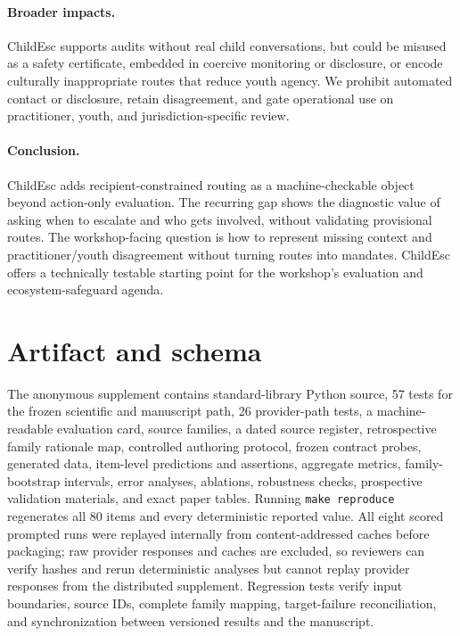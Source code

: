 \documentclass{article}
\begin{document}
\paragraph{Broader impacts.} ChildEsc supports audits without real child conversations, but could be misused as a safety certificate, embedded in coercive monitoring or disclosure, or encode culturally inappropriate routes that reduce youth agency. We prohibit automated contact or disclosure, retain disagreement, and gate operational use on practitioner, youth, and jurisdiction-specific review.

\paragraph{Conclusion.} ChildEsc adds recipient-constrained routing as a machine-checkable object beyond action-only evaluation. The recurring gap shows the diagnostic value of asking when to escalate and who gets involved, without validating provisional routes. The workshop-facing question is how to represent missing context and practitioner/youth disagreement without turning routes into mandates. ChildEsc offers a technically testable starting point for the workshop's evaluation and ecosystem-safeguard agenda.

\clearpage



\appendix

\section{Artifact and schema}

The anonymous supplement contains standard-library Python source, 57 tests for the frozen scientific and manuscript path, 26 provider-path tests, a machine-readable evaluation card, source families, a dated source register, retrospective family rationale map, controlled authoring protocol, frozen contract probes, generated data, item-level predictions and assertions, aggregate metrics, family-bootstrap intervals, error analyses, ablations, robustness checks, prospective validation materials, and exact paper tables. Running \texttt{make reproduce} regenerates all 80 items and every deterministic reported value. All eight scored prompted runs were replayed internally from content-addressed caches before packaging; raw provider responses and caches are excluded, so reviewers can verify hashes and rerun deterministic analyses but cannot replay provider responses from the distributed supplement. Regression tests verify input boundaries, source IDs, complete family mapping, target-failure reconciliation, and synchronization between versioned results and the manuscript.
\end{document}
